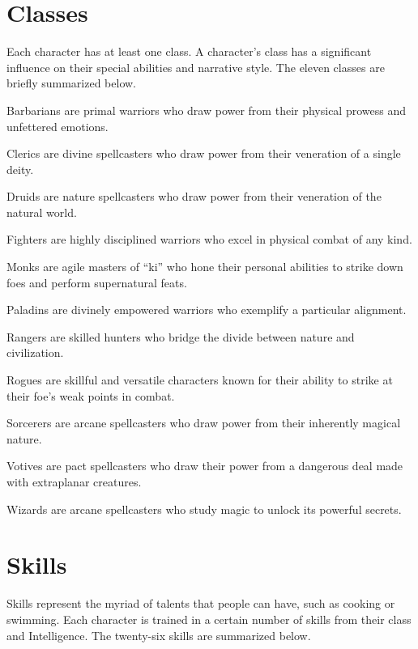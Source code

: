 \section{Classes}
  Each character has at least one class.
  A character's class has a significant influence on their special abilities and narrative style.
  The eleven classes are briefly summarized below.

  \begin{raggeditemize}
    \item Barbarians are primal warriors who draw power from their physical prowess and unfettered emotions.
    \item Clerics are divine spellcasters who draw power from their veneration of a single deity.
    \item Druids are nature spellcasters who draw power from their veneration of the natural world.
    \item Fighters are highly disciplined warriors who excel in physical combat of any kind.
    \item Monks are agile masters of ``ki'' who hone their personal abilities to strike down foes and perform supernatural feats.
    \item Paladins are divinely empowered warriors who exemplify a particular alignment.
    \item Rangers are skilled hunters who bridge the divide between nature and civilization.
    \item Rogues are skillful and versatile characters known for their ability to strike at their foe's weak points in combat.
    \item Sorcerers are arcane spellcasters who draw power from their inherently magical nature.
    \item Votives are pact spellcasters who draw their power from a dangerous deal made with extraplanar creatures.
    \item Wizards are arcane spellcasters who study magic to unlock its powerful secrets.
  \end{raggeditemize}

\section{Skills}
  Skills represent the myriad of talents that people can have, such as cooking or swimming.
  Each character is trained in a certain number of skills from their class and Intelligence.
  The twenty-six skills are summarized below.

